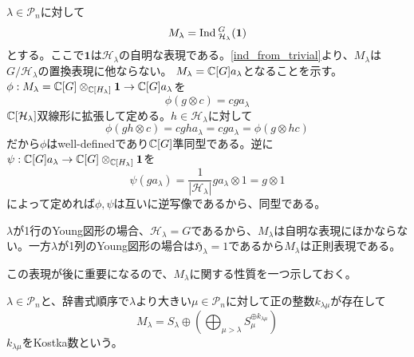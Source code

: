 \documentclass{ltjsreport}
\begin{document}
\begin{eg}\label{ind_from_horizontal_perm}
  $\lambda\in\mathcal{P}_n$に対して
  \[
  M_\lambda=\text{Ind}\:_{\mathcal{H}_\lambda}^{G}(\mathbf{1})  
  \]
  とする。ここで$\mathbf{1}$は$\mathcal{H}_\lambda$の自明な表現である。\ref{ind_from_trivial}より、$M_\lambda$は$G/\mathcal{H}_\lambda$の置換表現に他ならない。
  $M_\lambda=\mathbb{C}[G]a_\lambda$となることを示す。
  $\phi:M_\lambda=\mathbb{C}[G]\otimes_{\mathbb{C}[H_\lambda]} \mathbf{1}\rightarrow \mathbb{C}[G]a_\lambda$を
  \[
  \phi(g\otimes c)=cga_\lambda  
  \]
  $\mathbb{C}[\mathcal{H}_\lambda]$双線形に拡張して定める。$h\in\mathcal{H}_\lambda$に対して
  \[
  \phi(gh\otimes c)=cgha_\lambda=cga_\lambda=\phi(g\otimes hc)
  \]
  だから$\phi$はwell-definedであり$\mathbb{C}[G]$準同型である。逆に$\psi:\mathbb{C}[G]a_\lambda\rightarrow\mathbb{C}[G]\otimes_{\mathbb{C}[H_\lambda]} \mathbf{1}$を
  \[
  \psi(ga_\lambda)=\frac{1}{|\mathcal{H}_\lambda|}ga_\lambda\otimes 1=  g\otimes 1
  \]
  によって定めれば$\phi,\psi$は互いに逆写像であるから、同型である。
  
  $\lambda$が1行のYoung図形の場合、$\mathcal{H}_\lambda=G$であるから、$M_\lambda$は自明な表現にほかならない。一方$\lambda$が1列のYoung図形の場合は$\mathfrak{H}_\lambda=1$であるから$M_\lambda$は正則表現である。
  
  この表現が後に重要になるので、$M_\lambda$に関する性質を一つ示しておく。
\end{eg}

\begin{theo}[Youngの規則]\label{young_rule}
  $\lambda\in\mathcal{P}_n$と、辞書式順序で$\lambda$より大きい$\mu\in\mathcal{P}_n$に対して正の整数$k_{\lambda\mu}$が存在して
  \[
  M_\lambda=S_\lambda\oplus \left(\bigoplus_{\mu>\lambda}S_\mu^{\oplus k_{\lambda\mu}}\right)
  \]
  $k_{\lambda\mu}$をKostka数という。
\end{theo}
\end{document}
